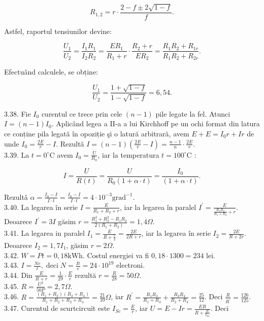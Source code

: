$$
R_{1,2}=r \cdot \frac{2-f \pm 2 \sqrt{1-f}}{f} .
$$

Astfel, raportul tensiunilor devine:

$$
\frac{U_{1}}{U_{2}}=\frac{I_{1} R_{1}}{I_{2} R_{2}}=\frac{E R_{1}}{R_{1}+r} \cdot \frac{R_{2}+r}{E R_{2}}=\frac{R_{1} R_{2}+R_{1 r}}{R_{1} R_{2}+R_{2 r}} .
$$

Efectuând calculele, se obține:

$$
\frac{U_{1}}{U_{2}}=\frac{1+\sqrt{1-f}}{1-\sqrt{1-f}}=6,54 .
$$

3.38. Fie $I_{0}$ curentul ce trece prin cele $(n-1)$ pile legate la fel. Atunci $I=(n-1) I_{0}$. Aplicând legea a II-a a lui Kirchhoff pe un ochi format din latura ce conține pila legată în opoziție şi o latură arbitrară, avem $E+E=I_{0} r+I r$ de unde $I_{0}=\frac{2 E}{r}-I$. Rezultă $I=(n-1)\left(\frac{2 E}{r}-I\right)=\frac{n-1}{n} \cdot \frac{2 E}{r}$.\\
3.39. La $t=0^{\circ} \mathrm{C}$ avem $I_{0}=\frac{U}{R_{0}}$, iar la temperatura $t=100^{\circ} \mathrm{C}$ :

$$
I=\frac{U}{R(t)}=\frac{U}{R_{0}(1+\alpha \cdot t)}=\frac{I_{0}}{(1+\alpha \cdot t)} .
$$

Rezultǎ $\alpha=\frac{I_{0}-I}{I \cdot t}=\frac{I_{0}-I}{I \cdot t}=4 \cdot 10^{-3} \mathrm{grad}^{-1}$.\\
3.40. La legarea în serie $I=\frac{E}{R_{1}+R_{2}+r}$, iar la legarea în paralel $I^{\prime}=\frac{E}{\frac{R_{1} R_{2}}{R_{1}+R_{2}}+r}$. Deoarece $I^{\prime}=3 I$ găsim $r=\frac{R_{1}^{2}+R_{2}^{2}-R_{1} R_{2}}{2\left(R_{1}+R_{2}\right)}=1,4 \Omega$.\\
3.41. La legarea in paralel $I_{1}=\frac{E}{R+\frac{r}{2}}=\frac{2 E}{2 R+r}$, iar la legarea în serie $I_{2}=\frac{2 E}{R+2 r}$. Deoarece $I_{2}=1,7 I_{1}$, găsim $r=2 \Omega$.\\
3.42. $W=P t=0,18 \mathrm{kWh}$. Costul energiei va fi $0,18 \cdot 1300=234$ lei.\\
3.43. $I=\frac{N e}{t}, \operatorname{deci} N=\frac{I t}{e}=24 \cdot 10^{19}$ electroni.\\
3.44. Din $\frac{E}{R+r}=\frac{1}{29} \cdot \frac{E}{r}$ rezultă $r=\frac{R}{28}=50 \Omega$.\\
3.45. $R=\frac{U^{2}}{50 P}=2,7 \Omega$.\\
3.46. $R=\frac{\left(R_{1}+R_{2}\right)\left(R_{2}+R_{4}\right)}{R_{1}+R_{2}+R_{2}+R_{4}}=\frac{21}{10} \Omega$, iar $R^{\prime}=\frac{R_{1} R_{3}}{R_{1}+R_{3}}+\frac{R_{2} R_{4}}{R_{2}+R_{4}}=\frac{25}{12}$. Deci $\frac{R}{R^{\prime}}=\frac{126}{125}$.\\
3.47. Curentul de scurtcircuit este $I_{S c}=\frac{E}{r}$, iar $U=E-I r=\frac{E R}{R+\frac{E}{I_{S c}}}$. Deci

